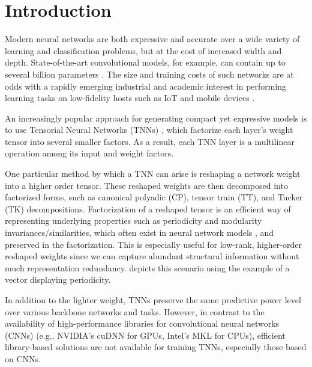 \section{Introduction}
\label{sec:introduction}

Modern neural networks are both expressive and accurate over a wide variety of learning and classification problems, but at the cost of increased width and depth. State-of-the-art convolutional models, for example, can contain up to several billion parameters \citep{khan2020survey,szegedy2015going, brown2020language}. The size and training costs of such networks are at odds with a rapidly emerging industrial and academic interest in performing learning tasks on low-fidelity hosts such as IoT and mobile devices \citep{mcmahan2017communication,li2018learning,kairouz2019advances}.

An increasingly popular approach for generating compact yet expressive models is to use Tensorial Neural Networks (TNNs) \citep{lebedev2015speeding, kossaifi2017tensor, kossaifi2020tensor,su2018tensorial}, which factorize each layer’s weight tensor into several smaller factors.
As a result, each TNN layer is a multilinear operation among its input and weight factors.

One particular method by which a TNN can arise is reshaping a network weight into a higher order tensor. These reshaped weights are then decomposed into factorized forms, such as canonical polyadic (CP), tensor train (TT), and Tucker (TK) decompositions. Factorization of a reshaped tensor is an efficient way of representing underlying properties such as periodicity and modularity invariances/similarities, which often exist in neural network models \citep{lebedev2015speeding, garipov2016ultimate, su2018tensorial,wang2018wide}, and preserved in the factorization. This is especially useful for low-rank, higher-order reshaped weights since we can capture abundant structural information without much representation redundancy.  depicts this scenario using the example of a vector displaying periodicity.



In addition to the lighter weight, TNNs preserve the same predictive power level over various backbone networks and tasks. However, in contrast to the availability of high-performance libraries for convolutional neural networks (CNNs) (e.g., NVIDIA’s cuDNN for GPUs, Intel’s MKL for CPUs), efficient library-based solutions are not available for training TNNs, especially those based on CNNs.

